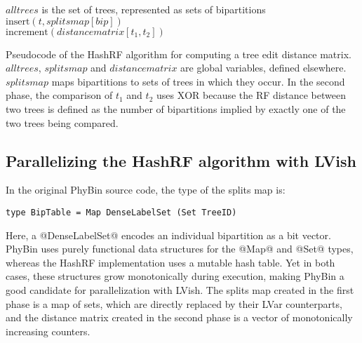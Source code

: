 \singlespacing
\begin{algorithm}
  \begin{algorithmic}[0] %
     \Comment $\mathit{alltrees}$ is the set of trees, represented as sets of bipartitions
    \hspace{3em}\\
    \hspace{3em}$\mathrm{insert}(t, \mathit{splitsmap}[\mathit{bip}])$
    \EndFor
    \EndFor
    \Comment 
     \\
    \hspace{6em}$\mathrm{increment}(\mathit{distancematrix}[t_1, t_2])$
    \EndIf
    \EndFor
    \EndFor
    \EndFor
  \end{algorithmic} 
  \caption{Pseudocode of the HashRF algorithm for computing a tree
    edit distance matrix.  $\mathit{alltrees}$, $\mathit{splitsmap}$
    and $\mathit{distancematrix}$ are global variables, defined
    elsewhere.  $\mathit{splitsmap}$ maps bipartitions to sets of
    trees in which they occur.  In the second phase, the comparison of
    $t_1$ and $t_2$ uses $\mathrm{XOR}$ because the RF distance
    between two trees is defined as the number of bipartitions implied
    by exactly one of the two trees being compared.}
  \label{alg:hashrf}
\end{algorithm}
\doublespacing

\subsection{Parallelizing the HashRF algorithm with LVish}

In the original PhyBin source code, the type of the splits map is:

\singlespacing
\begin{lstlisting}
type BipTable = Map DenseLabelSet (Set TreeID)
\end{lstlisting}
\doublespacing

Here, a @DenseLabelSet@ encodes an individual bipartition as a bit
vector.  PhyBin uses purely functional data structures for the @Map@
and @Set@ types, whereas the HashRF implementation uses a mutable hash
table.  Yet in both cases, these structures grow monotonically during
execution, making PhyBin a good candidate for parallelization with
LVish.  The splits map created in the first phase is a map of sets,
which are directly replaced by their LVar counterparts, and the
distance matrix created in the second phase is a vector of
monotonically increasing counters.  

